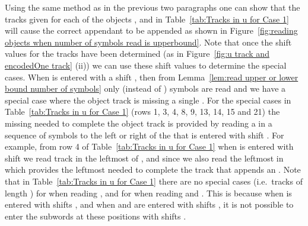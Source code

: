 \documentclass[11pt]{article} \usepackage{amsfonts,amsmath,amssymb,amsthm}
\begin{document}
Using the same method as in the previous two paragraphs one can show that the  tracks given for each of the objects ,  and  in Table~\ref{tab:Tracks in u for Case 1} will cause the correct appendant to be appended as shown in Figure~\ref{fig:reading objects when number of symbols read is upperbound}. 
Note that once the shift values for the  tracks have been determined (as in Figure~\ref{fig:u track and encodedOne track} (ii)) we can use these shift values to determine the special cases. 
When  is entered with a shift , then from Lemma~\ref{lem:read upper or lower bound number of symbols} only  (instead of ) symbols are read and we have a special case where the object track is missing a single . 
For the special cases in Table~\ref{tab:Tracks in u for Case 1} (rows 1, 3, 4, 8, 9, 13, 14, 15 and 21) the missing  needed to complete the object track is provided by reading a  in a sequence of  symbols to the left or right of the  that is entered with shift . 
For example, from row 4 of Table~\ref{tab:Tracks in u for Case 1} when  is entered with shift  we read track  in the leftmost  of , and since  we also read the leftmost  in  which provides the leftmost  needed to complete the track  that appends an . 
Note that in Table~\ref{tab:Tracks in u for Case 1} there are no special cases (i.e.~tracks of length ) for  when reading , and for  when reading  and . 
This is because when  is entered with shifts , and when  and  are entered with shifts , it is not possible to enter the  subwords at these positions with shifts .
 

 
 
\end{document}
